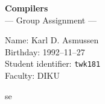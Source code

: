 \documentclass[12pt, a4paper]{article}
\renewcommand{\headrulewidth}{0pt}
\begin{document}
\thispagestyle{empty}

\begin{center}
\textbf{\Huge Compilers}\\
\huge --- Group Assignment ---
\end{center}
\vspace{2em}

\begin{center}
\begin{minipage}{0.7\textwidth}
\LARGE Name: Karl D. Asmussen\\[1em]
Birthday: 1992--11--27\\[1em]
Student identifier: \texttt{twk181} \\[1em]
Faculty: DIKU
\end{minipage}
\end{center}

\pagebreak

\setcounter{page}{1}
\tableofcontents

\pagebreak

se

\end{document}
